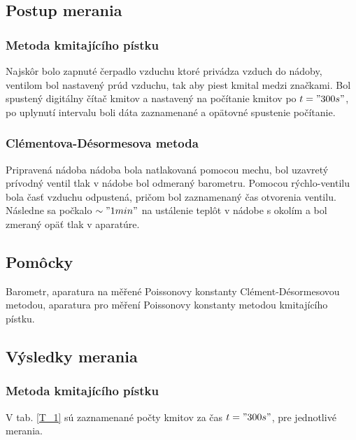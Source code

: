 \documentclass[10pt]{scrartcl}
\begin{document}


\subsection{Postup merania}
\subsubsection{Metoda kmitajícího pístku}
Najskôr bolo zapnuté čerpadlo vzduchu ktoré privádza vzduch do nádoby, ventilom bol nastavený prúd vzduchu, tak aby piest kmital medzi značkami.
Bol spustený digitálny čítač kmitov a nastavený na počítanie kmitov po $t="300 s"$, po uplynutí intervalu boli dáta zaznamenané a opätovné spustenie počítanie. 

\subsubsection{ Clémentova-Désormesova metoda}

Pripravená nádoba nádoba bola natlakovaná pomocou mechu, bol uzavretý prívodný ventil tlak v nádobe bol odmeraný barometru.
Pomocou rýchlo-ventilu bola časť vzduchu odpustená, pričom bol zaznamenaný čas otvorenia ventilu.
Následne sa počkalo $\sim "1 min"$ na ustálenie teplôt v nádobe s okolím a bol zmeraný opäť tlak v aparatúre.

\subsection{Pomôcky}
Barometr, aparatura na měřené Poissonovy konstanty Clément-Désormesovou metodou,
aparatura pro měření Poissonovy konstanty metodou kmitajícího pístku.

\subsection{Výsledky merania}
\subsubsection{Metoda kmitajícího pístku}
V tab. \ref{T_1} sú zaznamenané počty kmitov za čas $t = "300 s"$, pre jednotlivé merania.
\end{document}
